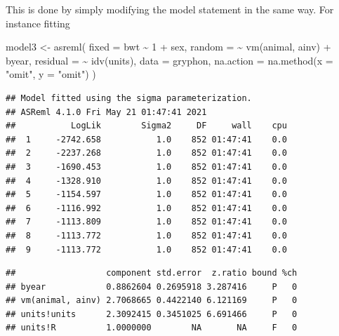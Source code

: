 \documentclass[
  12pt,
]{book}
\newenvironment{Shaded}{\begin{snugshade}}{\end{snugshade}}
\newcommand{\AttributeTok}[1]{\textcolor[rgb]{0.77,0.63,0.00}{#1}}
\newcommand{\DecValTok}[1]{\textcolor[rgb]{0.00,0.00,0.81}{#1}}
\newcommand{\FunctionTok}[1]{\textcolor[rgb]{0.00,0.00,0.00}{#1}}
\newcommand{\NormalTok}[1]{#1}
\newcommand{\OtherTok}[1]{\textcolor[rgb]{0.56,0.35,0.01}{#1}}
\newcommand{\SpecialCharTok}[1]{\textcolor[rgb]{0.00,0.00,0.00}{#1}}
\newcommand{\StringTok}[1]{\textcolor[rgb]{0.31,0.60,0.02}{#1}}
\begin{document}
This is done by simply modifying the model statement in the same way. For instance fitting

\begin{Shaded}
\begin{Highlighting}[]
\NormalTok{model3 }\OtherTok{\textless{}{-}} \FunctionTok{asreml}\NormalTok{(}
  \AttributeTok{fixed =}\NormalTok{ bwt }\SpecialCharTok{\textasciitilde{}} \DecValTok{1} \SpecialCharTok{+}\NormalTok{ sex,}
  \AttributeTok{random =} \SpecialCharTok{\textasciitilde{}} \FunctionTok{vm}\NormalTok{(animal, ainv) }\SpecialCharTok{+}\NormalTok{ byear,}
  \AttributeTok{residual =} \SpecialCharTok{\textasciitilde{}} \FunctionTok{idv}\NormalTok{(units),}
  \AttributeTok{data =}\NormalTok{ gryphon,}
  \AttributeTok{na.action =} \FunctionTok{na.method}\NormalTok{(}\AttributeTok{x =} \StringTok{"omit"}\NormalTok{, }\AttributeTok{y =} \StringTok{"omit"}\NormalTok{)}
\NormalTok{)}
\end{Highlighting}
\end{Shaded}

\begin{verbatim}
## Model fitted using the sigma parameterization.
## ASReml 4.1.0 Fri May 21 01:47:41 2021
##           LogLik        Sigma2     DF     wall    cpu
##  1     -2742.658           1.0    852 01:47:41    0.0
##  2     -2237.268           1.0    852 01:47:41    0.0
##  3     -1690.453           1.0    852 01:47:41    0.0
##  4     -1328.910           1.0    852 01:47:41    0.0
##  5     -1154.597           1.0    852 01:47:41    0.0
##  6     -1116.992           1.0    852 01:47:41    0.0
##  7     -1113.809           1.0    852 01:47:41    0.0
##  8     -1113.772           1.0    852 01:47:41    0.0
##  9     -1113.772           1.0    852 01:47:41    0.0
\end{verbatim}

\begin{Shaded}
\end{Shaded}

\begin{verbatim}
##                  component std.error  z.ratio bound %ch
## byear            0.8862604 0.2695918 3.287416     P   0
## vm(animal, ainv) 2.7068665 0.4422140 6.121169     P   0
## units!units      2.3092415 0.3451025 6.691466     P   0
## units!R          1.0000000        NA       NA     F   0
\end{verbatim}
\end{document}
